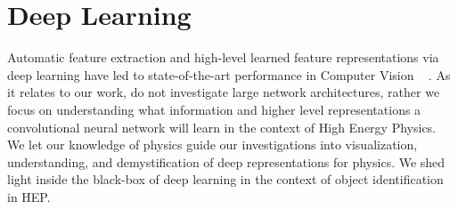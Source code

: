 \section{Deep Learning} %
\label{sec:deep_learning}

Automatic feature extraction and high-level learned feature representations via deep learning have led to state-of-the-art performance in Computer Vision ~\cite{vggnet} \cite{maxout:goodfellow} \cite{dropout:and:LRN}. As it relates to our work, do not investigate large network architectures, rather we focus on  understanding what information and higher level representations a convolutional neural network will learn in the context of High Energy Physics. We let our knowledge of physics guide our investigations into visualization, understanding, and demystification of deep representations for physics. We shed light inside the black-box of deep learning in the context of object identification in HEP.

